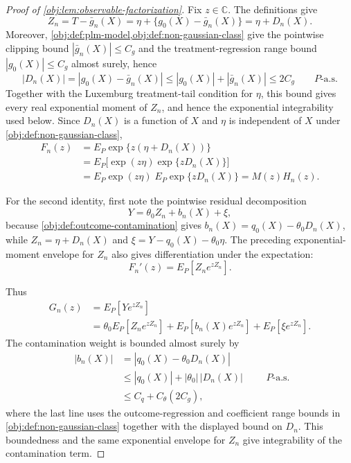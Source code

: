 \documentclass[11pt]{article}
\begin{document}
\begin{proof}[Proof of \cref{obj:lem:observable-factorization}]
Fix \(z\in\mathbb C\).  The definitions give
\[
Z_n=T-\bar g_n(X)=\eta+\{g_0(X)-\bar g_n(X)\}=\eta+D_n(X).
\]
Moreover, \cref{obj:def:plm-model,obj:def:non-gaussian-class} give the pointwise clipping bound \(|\bar g_n(X)|\le C_g\) and the treatment-regression range bound \(|g_0(X)|\le C_g\) almost surely, hence
\[
 |D_n(X)|=|g_0(X)-\bar g_n(X)|
 \le |g_0(X)|+|\bar g_n(X)|
 \le 2C_g
 \qquad P\text{-a.s.}
\]
Together with the Luxemburg treatment-tail condition for \(\eta\), this bound gives every real exponential moment of \(Z_n\), and hence the exponential integrability used below. %
Since \(D_n(X)\) is a function of \(X\) and \(\eta\) is independent of \(X\) under \cref{obj:def:non-gaussian-class},
\[
\begin{aligned}
F_n(z)
&=E_P\exp\{z(\eta+D_n(X))\}  \\
&=E_P\bigl[\exp(z\eta)\exp\{zD_n(X)\}\bigr] \\
&=E_P\exp(z\eta)\;E_P\exp\{zD_n(X)\}
=M(z)H_n(z).
\end{aligned}
\]

For the second identity, first note the pointwise residual decomposition
\[
Y=\theta_0 Z_n+b_n(X)+\xi,
\]
because \cref{obj:def:outcome-contamination} gives \(b_n(X)=q_0(X)-\theta_0D_n(X)\), while \(Z_n=\eta+D_n(X)\) and \(\xi=Y-q_0(X)-\theta_0\eta\).  The preceding exponential-moment envelope for \(Z_n\) also gives differentiation under the expectation:
\[
F_n'(z)
=
E_P\!\left[Z_n e^{zZ_n}\right].
\]

Thus
\[
\begin{aligned}
G_n(z)
&=E_P\!\left[Y e^{zZ_n}\right] \\
&=\theta_0 E_P\!\left[Z_ne^{zZ_n}\right]
  +E_P\!\left[b_n(X)e^{zZ_n}\right]
  +E_P\!\left[\xi e^{zZ_n}\right].
\end{aligned}
\]
The contamination weight is bounded almost surely by
\[
\begin{aligned}
 |b_n(X)|
 &=|q_0(X)-\theta_0D_n(X)| \\
 &\le |q_0(X)|+|\theta_0|\,|D_n(X)| \\
 &\le C_q+C_{\theta}(2C_g),
\end{aligned}
\qquad P\text{-a.s.}
\]
where the last line uses the outcome-regression and coefficient range bounds in \cref{obj:def:non-gaussian-class} together with the displayed bound on \(D_n\).  This boundedness and the same exponential envelope for \(Z_n\) give integrability of the contamination term. %


\end{proof}
\end{document}
